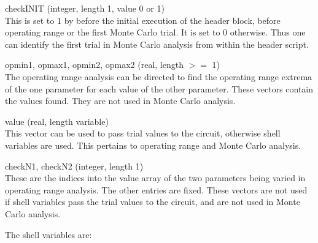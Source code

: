 \begin{description}
\item{{\et checkINIT}  (integer, length 1, value 0 or 1)}\\
This is set to 1 by {\WRspice} before the initial execution of the
header block, before operating range or the first Monte Carlo trial. 
It is set to 0 otherwise.  Thus one can identify the first trial in
Monte Carlo analysis from within the header script.

\item{{\et opmin1, opmax1, opmin2, opmax2} (real, length $>=$ 1)}\\
The operating range analysis can be directed to find the operating
range extrema of the one parameter for each value of the other
parameter.  These vectors contain the values found.  They are not used
in Monte Carlo analysis.

\item{{\et value} (real, length variable)}\\
This vector can be used to pass trial values to the circuit, otherwise
shell variables are used.  This pertains to operating range and Monte
Carlo analysis.

\item{{\et checkN1, checkN2} (integer, length 1)}\\
These are the indices into the value array of the two parameters being
varied in operating range analysis.  The other entries are fixed. 
These vectors are not used if shell variables pass the trial values to
the circuit, and are not used in Monte Carlo analysis.
\end{description}

The shell variables are:

